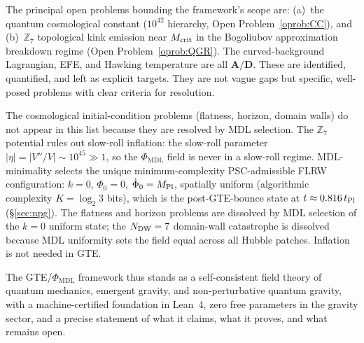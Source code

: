 \documentclass[11pt]{article}
\theoremstyle{remark}
\newcommand{\PHIMDL}{\Phi_{\mathrm{MDL}}}
\newcommand{\ZS}{\mathbb{Z}_7}
\newcommand{\CatAD}{\textbf{A/D}}
\begin{document}
The principal open problems bounding the framework's scope are:
(a)~the quantum cosmological constant ($10^{42}$ hierarchy, Open
Problem~\ref{oprob:CC}), and (b)~$\ZS$ topological kink emission near
$M_{\rm crit}$ in the Bogoliubov approximation breakdown regime
(Open Problem~\ref{oprob:QGR}).  The curved-background Lagrangian, EFE,
and Hawking temperature are all $\CatAD$.
These are identified, quantified, and left as explicit targets.
They are not vague gaps but specific, well-posed problems with clear
criteria for resolution.

The cosmological initial-condition problems (flatness, horizon, domain walls)
do not appear in this list because they are resolved by MDL selection.  The
$\ZS$ potential rules out slow-roll inflation: the slow-roll parameter
$|\eta| = |V''/V| \sim 10^{45} \gg 1$, so the $\PHIMDL$ field is never in a
slow-roll regime.  MDL-minimality selects the unique minimum-complexity
PSC-admissible FLRW configuration: $k=0$, $\Phi_0=0$, $\dot\Phi_0=M_{\rm Pl}$,
spatially uniform (algorithmic complexity $K=\log_2 3$ bits), which is the
post-GTE-bounce state at $t\approx 0.816\,t_{\rm Pl}$ (\S\ref{sec:npg}).
The flatness and horizon problems are dissolved by MDL selection of the
$k=0$ uniform state; the $N_{\rm DW}=7$ domain-wall catastrophe is dissolved
because MDL uniformity sets the field equal across all Hubble patches.
Inflation is not needed in GTE.

The GTE/$\PHIMDL$ framework thus stands as a self-consistent field theory
of quantum mechanics, emergent gravity, and non-perturbative quantum gravity,
with a machine-certified foundation in Lean~4, zero free parameters in the
gravity sector, and a precise statement of what it claims, what it proves,
and what remains open.
\end{document}
